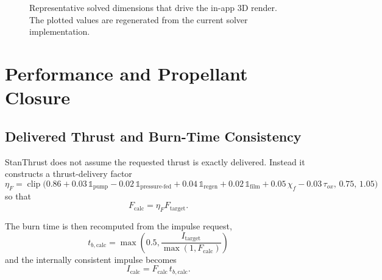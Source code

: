 \documentclass[11pt]{article}
\newcommand{\clip}{\operatorname{clip}}
\begin{document}
\begin{figure}[H]
\centering
{}
\caption{Representative solved dimensions that drive the in-app 3D render. The plotted values are regenerated from the current solver implementation.}
\end{figure}

\section{Performance and Propellant Closure}
\subsection{Delivered Thrust and Burn-Time Consistency}
StanThrust does not assume the requested thrust is exactly delivered. Instead it constructs a thrust-delivery factor
\begin{equation}
\eta_F=
\clip\!\Big(
0.86
+0.03\,\mathbb{1}_{\text{pump}}
-0.02\,\mathbb{1}_{\text{pressure-fed}}
+0.04\,\mathbb{1}_{\text{regen}}
+0.02\,\mathbb{1}_{\text{film}}
+0.05\,\chi_f
-0.03\,\tau_{ox},
\,
0.75,\,
1.05
\Big)
\label{eq:thrust-delivery}
\end{equation}
so that
\begin{equation}
F_{\text{calc}}=\eta_F F_{\text{target}}.
\label{eq:calc-thrust}
\end{equation}

The burn time is then recomputed from the impulse request,
\begin{equation}
t_{b,\text{calc}}=\max\!\left(0.5,\frac{I_{\text{target}}}{\max(1,F_{\text{calc}})}\right)
\label{eq:calc-burn}
\end{equation}
and the internally consistent impulse becomes
\begin{equation}
I_{\text{calc}}=F_{\text{calc}}\,t_{b,\text{calc}}.
\label{eq:calc-impulse}
\end{equation}
\end{document}
